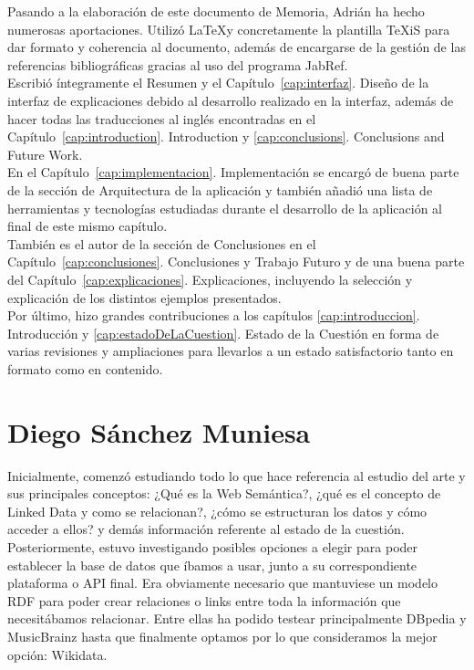 Pasando a la elaboración de este documento de Memoria, Adrián ha hecho numerosas aportaciones. Utilizó \LaTeX y concretamente la plantilla TeXiS para dar formato y coherencia al documento, además de encargarse de la gestión de las referencias bibliográficas gracias al uso del programa JabRef. \\

Escribió íntegramente el Resumen y el Capítulo~\ref{cap:interfaz}. Diseño de la interfaz de explicaciones debido al desarrollo realizado en la interfaz, además de hacer todas las traducciones al inglés encontradas en el Capítulo~\ref{cap:introduction}. Introduction y \ref{cap:conclusions}. Conclusions and Future Work. \\


En el Capítulo~\ref{cap:implementacion}. Implementación se encargó de buena parte de la sección de Arquitectura de la aplicación y  también añadió una lista de herramientas y tecnologías estudiadas durante el desarrollo de la aplicación al final de este mismo capítulo. \\

También es el autor de la sección de Conclusiones en el Capítulo~\ref{cap:conclusiones}. Conclusiones y Trabajo Futuro y de una buena parte del Capítulo~\ref{cap:explicaciones}. Explicaciones, incluyendo la selección y explicación de los distintos ejemplos presentados. \\

Por último, hizo grandes contribuciones a los capítulos \ref{cap:introduccion}. Introducción y \ref{cap:estadoDeLaCuestion}. Estado de la Cuestión en forma de varias revisiones y ampliaciones para llevarlos a un estado satisfactorio tanto en formato como en contenido. \\


\section{Diego Sánchez Muniesa}

Inicialmente, comenzó estudiando todo lo que hace referencia al estudio del arte y sus principales conceptos: ¿Qué es la Web Semántica?, ¿qué es el concepto de Linked Data y como se relacionan?, ¿cómo se estructuran los datos y cómo acceder a ellos? y demás información referente al estado de la cuestión.\\

Posteriormente, estuvo investigando posibles opciones a elegir para poder establecer la base de datos que íbamos a usar, junto a su correspondiente plataforma o API final. Era obviamente necesario que mantuviese un modelo RDF para poder crear relaciones o links entre toda la información que necesitábamos relacionar. Entre ellas ha podido testear principalmente DBpedia y MusicBrainz hasta que finalmente optamos por lo que consideramos la mejor opción: Wikidata.\\

